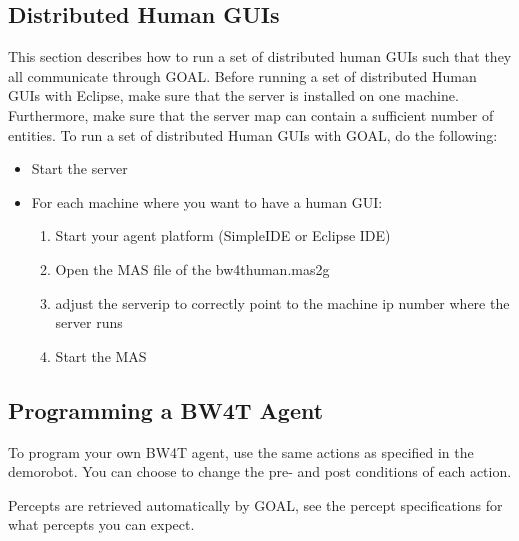 \documentclass[11pt,a4paper]{article}
\begin{document}
\subsection{Distributed Human GUIs}
This section describes how to run a set of distributed human GUIs such that they all communicate through GOAL. Before running a set of distributed Human GUIs with Eclipse, make sure that the server is installed on one machine. Furthermore, make sure that the server map can contain a sufficient number of entities.
To run a set of distributed Human GUIs with GOAL, do the following:
\begin{itemize}
\item Start the server
\item For each machine where you want to have a human GUI:
    \begin{enumerate}
    \item Start your agent platform (SimpleIDE or  Eclipse IDE)
    \item Open the MAS file of the bw4thuman.mas2g
    \item adjust the serverip to correctly point to the machine ip number where the server runs
    \item Start the MAS
    \end{enumerate}
\end{itemize}

\subsection{Programming a BW4T Agent}
To program your own BW4T agent, use the same actions as specified in the demorobot. You can  choose to change the pre- and post conditions of each action.

Percepts are retrieved automatically by GOAL, see the percept specifications for what percepts you can expect.
\end{document}
